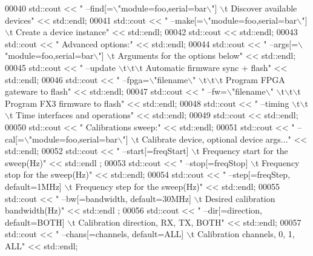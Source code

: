 \begin{DoxyCode}
00040     std::cout << \textcolor{stringliteral}{"    --find[=\(\backslash\)"module=foo,serial=bar\(\backslash\)"] \(\backslash\)t Discover available devices"} << std::endl;
00041     std::cout << \textcolor{stringliteral}{"    --make[=\(\backslash\)"module=foo,serial=bar\(\backslash\)"] \(\backslash\)t Create a device instance"} << std::endl;
00042     std::cout << std::endl;
00043     std::cout << \textcolor{stringliteral}{"  Advanced options:"} << std::endl;
00044     std::cout << \textcolor{stringliteral}{"    --args[=\(\backslash\)"module=foo,serial=bar\(\backslash\)"] \(\backslash\)t Arguments for the options below"} << std::endl;
00045     std::cout << \textcolor{stringliteral}{"    --update          \(\backslash\)t\(\backslash\)t\(\backslash\)t Automatic firmware sync + flash"} << std::endl;
00046     std::cout << \textcolor{stringliteral}{"    --fpga=\(\backslash\)"filename\(\backslash\)" \(\backslash\)t\(\backslash\)t\(\backslash\)t Program FPGA gateware to flash"} << std::endl;
00047     std::cout << \textcolor{stringliteral}{"    --fw=\(\backslash\)"filename\(\backslash\)"   \(\backslash\)t\(\backslash\)t\(\backslash\)t Program FX3  firmware to flash"} << std::endl;
00048     std::cout << \textcolor{stringliteral}{"    --timing          \(\backslash\)t\(\backslash\)t\(\backslash\)t Time interfaces and operations"} << std::endl;
00049     std::cout << std::endl;
00050     std::cout << \textcolor{stringliteral}{"  Calibrations sweep:"} << std::endl;
00051     std::cout << \textcolor{stringliteral}{"    --cal[=\(\backslash\)"module=foo,serial=bar\(\backslash\)"]  \(\backslash\)t Calibrate device, optional device args..."} << 
      std::endl;
00052     std::cout << \textcolor{stringliteral}{"    --start[=freqStart]                \(\backslash\)t Frequency start for the sweep(Hz)"} << std::endl
      ;
00053     std::cout << \textcolor{stringliteral}{"    --stop[=freqStop]                  \(\backslash\)t Frequency stop for the sweep(Hz)"} << std::endl;
00054     std::cout << \textcolor{stringliteral}{"    --step[=freqStep, default=1MHz]    \(\backslash\)t Frequency step for the sweep(Hz)"} << std::endl;
00055     std::cout << \textcolor{stringliteral}{"    --bw[=bandwidth, default=30MHz]    \(\backslash\)t Desired calibration bandwidth(Hz)"} << std::endl
      ;
00056     std::cout << \textcolor{stringliteral}{"    --dir[=direction, default=BOTH]    \(\backslash\)t Calibration direction, RX, TX, BOTH"} << 
      std::endl;
00057     std::cout << \textcolor{stringliteral}{"    --chans[=channels, default=ALL]    \(\backslash\)t Calibration channels, 0, 1, ALL"} << std::endl;

\end{DoxyCode}
